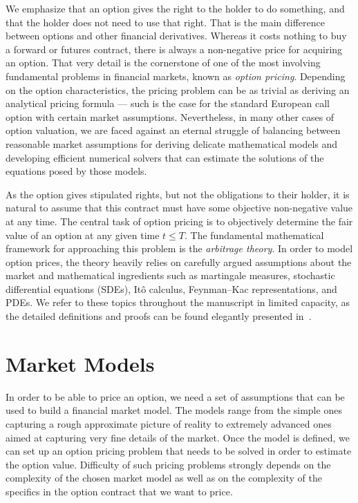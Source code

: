 \documentclass{UUThesisTemplate}
\begin{document}
\par
We emphasize that an option gives the right to the holder to do something, and that the holder does not need to use that right. That is the main difference between options and other financial derivatives. Whereas it costs nothing to buy a forward or futures contract, there is always a non-negative price for acquiring an option. That very detail is the cornerstone of one of the most involving fundamental problems in financial markets, known as \emph{option pricing}. Depending on the option characteristics, the pricing problem can be as trivial as deriving an analytical pricing formula --- such is the case for the standard European call option with certain market assumptions. Nevertheless, in many other cases of option valuation, we are faced against an eternal struggle of balancing between reasonable market assumptions for deriving delicate mathematical models and developing efficient numerical solvers that can estimate the solutions of the equations posed by those models.

\par
As the option gives stipulated rights, but not the obligations to their holder, it is natural to assume that this contract must have some objective non-negative value at any time. The central task of option pricing is to objectively determine the fair value of an option at any given time $t \leq T$. The fundamental mathematical framework for approaching this problem is the \emph{arbitrage theory}. In order to model option prices, the theory heavily relies on carefully argued assumptions about the market and mathematical ingredients such as martingale measures, stochastic differential equations (SDEs), It\^o calculus, Feynman--Kac representations, and PDEs. We refer to these topics throughout the manuscript in limited capacity, as the detailed definitions and proofs can be found elegantly presented in~\cite{bjork2009arbitrage}.
%





%
\section{Market Models}
\label{sec:models}
\par
In order to be able to price an option, we need a set of assumptions that can be used to build a financial market model. The models range from the simple ones capturing a rough approximate picture of reality to extremely advanced ones aimed at capturing very fine details of the market. Once the model is defined, we can set up an option pricing problem that needs to be solved in order to estimate the option value. Difficulty of such pricing problems strongly depends on the complexity of the chosen market model as well as on the complexity of the specifics in the option contract that we want to price.  
%
\end{document}
